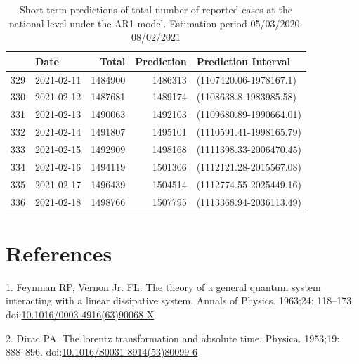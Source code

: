 \documentclass[10pt,letterpaper]{article}
\begin{document}
\begin{table}

\caption{\label{tab:unnamed-chunk-9}Short-term predictions of total number of reported cases at the national level under the AR1 model. Estimation period 05/03/2020-08/02/2021}
\centering
\begin{tabular}[t]{l|l|r|r|l}
\hline
  & Date & Total & Prediction & Prediction Interval\\
\hline
329 & 2021-02-11 & 1484900 & 1486313 & (1107420.06-1978167.1)\\
\hline
330 & 2021-02-12 & 1487681 & 1489174 & (1108638.8-1983985.58)\\
\hline
331 & 2021-02-13 & 1490063 & 1492103 & (1109680.89-1990664.01)\\
\hline
332 & 2021-02-14 & 1491807 & 1495101 & (1110591.41-1998165.79)\\
\hline
333 & 2021-02-15 & 1492909 & 1498168 & (1111398.33-2006470.45)\\
\hline
334 & 2021-02-16 & 1494119 & 1501306 & (1112121.28-2015567.08)\\
\hline
335 & 2021-02-17 & 1496439 & 1504514 & (1112774.55-2025449.16)\\
\hline
336 & 2021-02-18 & 1498766 & 1507795 & (1113368.94-2036113.49)\\
\hline
\end{tabular}
\end{table}

\hypertarget{references}{%
\section*{References}\label{references}}

\hypertarget{refs}{}
\leavevmode\hypertarget{ref-Feynman1963118}{}%
1. Feynman RP, Vernon Jr. FL. The theory of a general quantum system
interacting with a linear dissipative system. Annals of Physics.
1963;24: 118--173.
doi:\href{https://doi.org/10.1016/0003-4916(63)90068-X}{10.1016/0003-4916(63)90068-X}

\leavevmode\hypertarget{ref-Dirac1953888}{}%
2. Dirac PA. The lorentz transformation and absolute time. Physica.
1953;19: 888--896.
doi:\href{https://doi.org/10.1016/S0031-8914(53)80099-6}{10.1016/S0031-8914(53)80099-6}

\nolinenumbers
\end{document}
